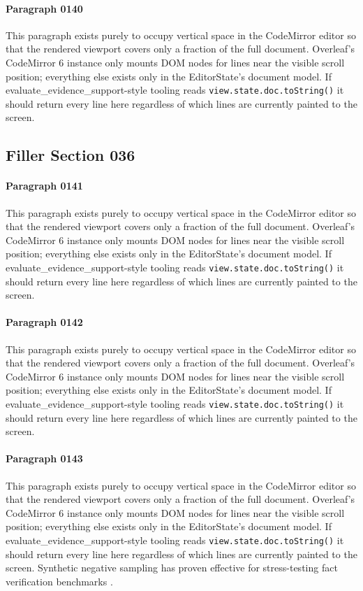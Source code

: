 \documentclass{article}
\begin{document}
\paragraph{Paragraph 0140}
This paragraph exists purely to occupy vertical space in the CodeMirror editor so that the rendered viewport covers only a fraction of the full document. Overleaf's CodeMirror 6 instance only mounts DOM nodes for lines near the visible scroll position; everything else exists only in the EditorState's document model. If evaluate\_evidence\_support-style tooling reads \texttt{view.state.doc.toString()} it should return every line here regardless of which lines are currently painted to the screen.

\subsection{Filler Section 036}
\paragraph{Paragraph 0141}
This paragraph exists purely to occupy vertical space in the CodeMirror editor so that the rendered viewport covers only a fraction of the full document. Overleaf's CodeMirror 6 instance only mounts DOM nodes for lines near the visible scroll position; everything else exists only in the EditorState's document model. If evaluate\_evidence\_support-style tooling reads \texttt{view.state.doc.toString()} it should return every line here regardless of which lines are currently painted to the screen.

\paragraph{Paragraph 0142}
This paragraph exists purely to occupy vertical space in the CodeMirror editor so that the rendered viewport covers only a fraction of the full document. Overleaf's CodeMirror 6 instance only mounts DOM nodes for lines near the visible scroll position; everything else exists only in the EditorState's document model. If evaluate\_evidence\_support-style tooling reads \texttt{view.state.doc.toString()} it should return every line here regardless of which lines are currently painted to the screen.

\paragraph{Paragraph 0143}
This paragraph exists purely to occupy vertical space in the CodeMirror editor so that the rendered viewport covers only a fraction of the full document. Overleaf's CodeMirror 6 instance only mounts DOM nodes for lines near the visible scroll position; everything else exists only in the EditorState's document model. If evaluate\_evidence\_support-style tooling reads \texttt{view.state.doc.toString()} it should return every line here regardless of which lines are currently painted to the screen. Synthetic negative sampling has proven effective for stress-testing fact verification benchmarks \citep{oconnor2016synthetic}.
\end{document}
